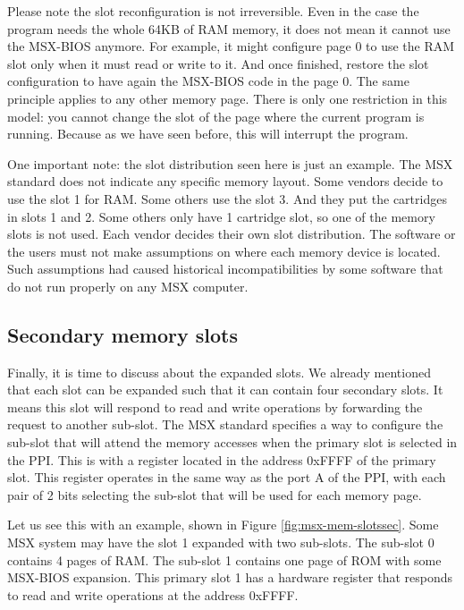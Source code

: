 Please note the slot reconfiguration is not irreversible. Even in the case the program needs the whole 64KB of RAM memory, it does not mean it cannot use the MSX-BIOS anymore. For example, it might configure page 0 to use the RAM slot only when it must read or write to it. And once finished, restore the slot configuration to have again the MSX-BIOS code in the page 0. The same principle applies to any other memory page. There is only one restriction in this model: you cannot change the slot of the page where the current program is running. Because as we have seen before, this will interrupt the program. 

One important note: the slot distribution seen here is just an example. The MSX standard does not indicate any specific memory layout. Some vendors decide to use the slot 1 for RAM. Some others use the slot 3. And they put the cartridges in slots 1 and 2. Some others only have 1 cartridge slot, so one of the memory slots is not used. Each vendor decides their own slot distribution. The software or the users must not make assumptions on where each memory device is located. Such assumptions had caused historical incompatibilities by some software that do not run properly on any MSX computer.

\subsection{Secondary memory slots}

Finally, it is time to discuss about the expanded slots. We already mentioned that each slot can be expanded such that it can contain four secondary slots. It means this slot will respond to read and write operations by forwarding the request to another sub-slot. The MSX standard specifies a way to configure the sub-slot that will attend the memory accesses when the primary slot is selected in the PPI. This is with a register located in the address 0xFFFF of the primary slot. This register operates in the same way as the port A of the PPI, with each pair of 2 bits selecting the sub-slot that will be used for each memory page. 

Let us see this with an example, shown in Figure \ref{fig:msx-mem-slotssec}. Some MSX system may have the slot 1 expanded with two sub-slots. The sub-slot 0 contains 4 pages of RAM. The sub-slot 1 contains one page of ROM with some MSX-BIOS expansion. This primary slot 1 has a hardware register that responds to read and write operations at the address 0xFFFF. 

